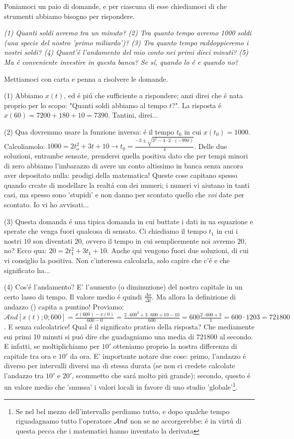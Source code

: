 Poniamoci un paio di domande, e per ciascuna di esse chiediamoci di che strumenti abbiamo bisogno per rispondere. 

{\em (1) Quanti soldi avremo tra un minuto? (2) Tra quanto tempo avremo 1000 soldi (una specie del nostro 'primo miliardo')? (3) Tra quanto
tempo raddoppieremo i nostri soldi? (4) Quant'\'e l'andamento del mio conto nei primi dieci minuti? (5) Ma \'e conveniente investire in questa banca?
Se s\'i, quando lo \'e e quando no?}

Mettiamoci con carta e penna a risolvere le domande.

(1) Abbiamo $x(t)$, ed \'e pi\'u che sufficiente a rispondere; anzi direi che \'e nata proprio per lo scopo:
"Quanti soldi abbiamo al tempo $t$?". La risposta \'e $x(60)=7200+180+10=7390$. Tantini, direi...

(2) Qua dovremmo usare la funzione inversa: \'e il tempo $t_0$ in cui $x(t_0)=1000$. Calcoliamolo:
$1000=2t_o^2+3t+10 \longrightarrow t_0=\frac{-3 \pm \sqrt{3^2-4 \cdot 2 \cdot (-990)}}{4}$. Delle due soluzioni,
entrambe sensate, prenderei quella positiva dato che per tempi minori di zero abbiamo l'imbarazzo di avere un conto
altissimo in banca senza ancora aver depositato nulla: prodigi della matematica! Queste cose capitano spesso quando
crcate di modellare la realt\'a con dei numeri; i numeri vi aiutano in tanti casi, ma spesso sono 'stupidi' e non
danno per scontato quello che {\em voi} date per scontato. Io vi ho avvisati...

(3) Questa domanda \'e una tipica domanda in cui buttate i dati in ua equazione e sperate che venga fuori qualcosa
di sensato. Ci chiediamo il tempo $t_1$ in cui i nostri $10$ son diventati $20$, ovvero il tempo in cui semplicemente
noi avremo $20$, no? Ecco qua: $20=2t_1^2+3t_1+10$. Anche qui vengono fuori due soluzioni, di cui vi consiglio la positiva.
Non c'interessa calcolarla, solo capire che c'\'e e che significato ha... 

(4) Cos'\'e l'andamento? E' l'aumento (o diminuzione) del nostro capitale in un certo lasso di tempo. Il valore medio
   \'e quindi $\frac{\Delta x}{\Delta t}$. Ma allora la definizione di andazzo () capita a puntino!
   Proviamo: $\mathcal{A}nd[x(t);0;600]=\frac{x(600)-x(0)}{600-0} = \frac{2\cdot600^2+3\cdot600+10-10}{600}=600\frac{2\cdot600+3}{1} = 600\cdot1203 = 721800$.
   E senza calcolatrice! Qual \'e il significato pratico della risposta? Che mediamente sui primi 10 minuti si pu\'o dire che guadagniamo una media di $721800$ \EUR
   al secondo. E infatti, se moltiplichiamo per $10'$ otteniamo proprio la nostra differenza di capitale tra ora e $10'$ da ora. E' importante notare due cose: primo,
   l'andazzo \'e diverso per intervalli diversi ma di stessa durata (se non ci credete calcolate l'andazzo tra $10'$ e $20'$, scommetto che sar\'a molto pi\'u grande);
   secondo, questo \'e un valore medio che 'smussa' i valori locali in favore di uno studio 'globale'\footnote{Se nel bel mezzo dell'intervallo perdiamo tutto,
   e dopo qualche tempo riguadagnamo tutto l'operatore $\mathcal{A}nd$ non se ne accorgerebbe: \'e in virt\'u di questa pecca che i matematici hanno inventato la derivata}.

